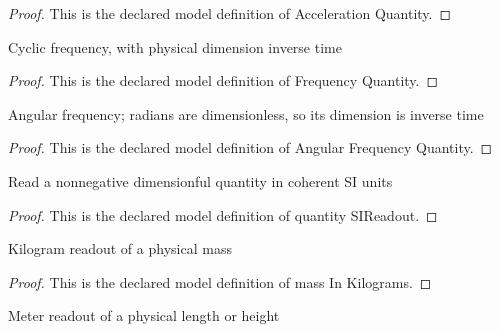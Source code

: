 \begin{proof}
  This is the declared model definition of Acceleration Quantity.
\end{proof}
\begin{definition}
  \label{def:physics:phyx-mini-0719:phyxminiproblems-problemphyxmini0719-frequencyquantity}
  Cyclic frequency, with physical dimension inverse time
\end{definition}
\begin{proof}
  This is the declared model definition of Frequency Quantity.
\end{proof}
\begin{definition}
  \label{def:physics:phyx-mini-0719:phyxminiproblems-problemphyxmini0719-angularfrequencyquantity}
  Angular frequency; radians are dimensionless, so its dimension is inverse time
\end{definition}
\begin{proof}
  This is the declared model definition of Angular Frequency Quantity.
\end{proof}
\begin{definition}
  \label{def:physics:phyx-mini-0719:phyxminiproblems-problemphyxmini0719-quantitysireadout}
  Read a nonnegative dimensionful quantity in coherent SI units
\end{definition}
\begin{proof}
  This is the declared model definition of quantity SIReadout.
\end{proof}
\begin{definition}
  \label{def:physics:phyx-mini-0719:phyxminiproblems-problemphyxmini0719-massinkilograms}
  Kilogram readout of a physical mass
\end{definition}
\begin{proof}
  This is the declared model definition of mass In Kilograms.
\end{proof}
\begin{definition}
  \label{def:physics:phyx-mini-0719:phyxminiproblems-problemphyxmini0719-lengthinmeters}
  Meter readout of a physical length or height
\end{definition}
